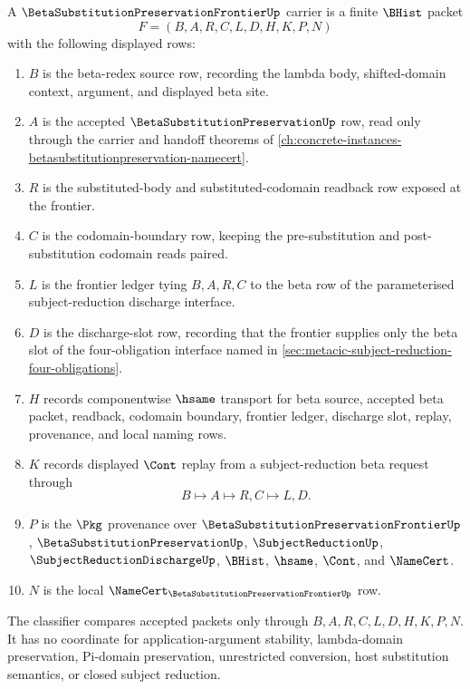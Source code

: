 \begin{definition}
\label{def:beta-substitution-preservation-frontier-carrier}
A $\BetaSubstitutionPreservationFrontierUp$ carrier is a finite $\BHist$ packet
$$
F=(B,A,R,C,L,D,H,K,P,N)
$$
with the following displayed rows:
\begin{enumerate}
\item $B$ is the beta-redex source row, recording the lambda body, shifted-domain context, argument, and displayed beta site.
\item $A$ is the accepted $\BetaSubstitutionPreservationUp$ row, read only through the carrier and handoff theorems of \autoref{ch:concrete-instances-betasubstitutionpreservation-namecert}.
\item $R$ is the substituted-body and substituted-codomain readback row exposed at the frontier.
\item $C$ is the codomain-boundary row, keeping the pre-substitution and post-substitution codomain reads paired.
\item $L$ is the frontier ledger tying $B,A,R,C$ to the beta row of the parameterised subject-reduction discharge interface.
\item $D$ is the discharge-slot row, recording that the frontier supplies only the beta slot of the four-obligation interface named in \autoref{sec:metacic-subject-reduction-four-obligations}.
\item $H$ records componentwise $\hsame$ transport for beta source, accepted beta packet, readback, codomain boundary, frontier ledger, discharge slot, replay, provenance, and local naming rows.
\item $K$ records displayed $\Cont$ replay from a subject-reduction beta request through
$$
B \longmapsto A \longmapsto R,C \longmapsto L,D .
$$
\item $P$ is the $\Pkg$ provenance over $\BetaSubstitutionPreservationFrontierUp$, $\BetaSubstitutionPreservationUp$, $\SubjectReductionUp$, $\SubjectReductionDischargeUp$, $\BHist$, $\hsame$, $\Cont$, and $\NameCert$.
\item $N$ is the local $\NameCert_{\BetaSubstitutionPreservationFrontierUp}$ row.
\end{enumerate}
The classifier compares accepted packets only through $B,A,R,C,L,D,H,K,P,N$. It has no coordinate for application-argument stability, lambda-domain preservation, Pi-domain preservation, unrestricted conversion, host substitution semantics, or closed subject reduction.
\end{definition}


